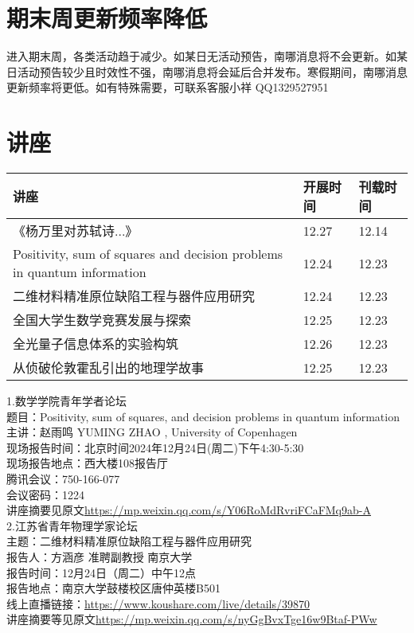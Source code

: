 \documentclass[letterpaper, 12pt]{article}
\begin{document}
\begin{multicols}{2}
\section{期末周更新频率降低}
进入期末周，各类活动趋于减少。如某日无活动预告，南哪消息将不会更新。如某日活动预告较少且时效性不强，南哪消息将会延后合并发布。寒假期间，南哪消息更新频率将更低。如有特殊需要，可联系客服小祥 QQ1329527951
\section{讲座}
\begin{tabularx}{0.5\textwidth}{|X|X|X|}
    \hline
    讲座 & 开展时间 & 刊载时间\\
    \hline\hline
《杨万里对苏轼诗...》 & 12.27 & 12.14\\\hline
Positivity, sum of squares and decision problems in quantum information & 12.24 & 12.23\\\hline
二维材料精准原位缺陷工程与器件应用研究 & 12.24 & 12.23\\\hline
全国大学生数学竞赛发展与探索 & 12.25 & 12.23\\\hline
全光量子信息体系的实验构筑 & 12.26 & 12.23\\\hline
从侦破伦敦霍乱引出的地理学故事 & 12.25 & 12.23\\\hline
\end{tabularx}

1.数学学院青年学者论坛\\
题目：Positivity, sum of squares, and decision problems in quantum information\\
主讲：赵雨鸣 YUMING ZHAO , University of Copenhagen\\
现场报告时间：北京时间2024年12月24日(周二)下午4:30-5:30\\
现场报告地点：西大楼108报告厅\\
腾讯会议：750-166-077\\
会议密码：1224\\
讲座摘要见原文\url{https://mp.weixin.qq.com/s/Y06RoMdRvriFCaFMq9ab-A}\\

2.江苏省青年物理学家论坛\\
主题：二维材料精准原位缺陷工程与器件应用研究\\
报告人：方涵彦 准聘副教授 南京大学\\
报告时间：12月24日（周二）中午12点\\
报告地点：南京大学鼓楼校区唐仲英楼B501\\
线上直播链接：\url{https://www.koushare.com/live/details/39870}\\
讲座摘要等见原文\url{https://mp.weixin.qq.com/s/nyGgBvxTge16w9Btaf-PWw}\\


\end{multicols}
\end{document}
